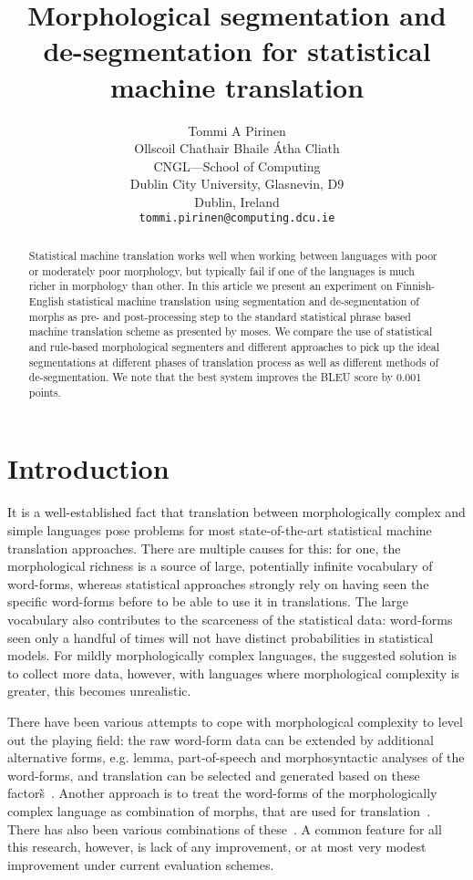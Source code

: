 \documentclass[11pt,letterpaper]{article}
\title{Morphological segmentation and de-segmentation for statistical machine
    translation\Thanks{This is an unpublished
authors draft}}
\author{Tommi A Pirinen\\
    Ollscoil Chathair Bhaile Átha Cliath\\
    CNGL---School of Computing\\
    Dublin City University, Glasnevin, D9\\
    Dublin, Ireland\\
    {\tt tommi.pirinen@computing.dcu.ie}
}
\begin{document}
\maketitle
\begin{abstract}
    Statistical machine translation works well when working between languages
    with poor or moderately poor morphology, but typically fail if one
    of the languages is much richer in morphology than other. In this article
    we present an experiment on Finnish-English statistical machine translation
    using segmentation and de-segmentation of morphs as pre- and post-processing
    step to the standard statistical phrase based machine translation scheme
    as presented by moses. We compare the use of statistical and rule-based
    morphological segmenters and different approaches to pick up the
    ideal segmentations at different phases of translation process as well
    as different methods of de-segmentation. We note that the best system
    improves the BLEU score by 0.001 points.
\end{abstract}

\section{Introduction}
\label{sec:introduction}

It is a well-established fact that translation between morphologically complex
and simple languages pose problems for most state-of-the-art statistical
machine translation approaches. There are multiple causes for this: for one,
the morphological richness is a source of large, potentially infinite
vocabulary of word-forms, whereas statistical approaches strongly rely on
having seen the specific word-forms before to be able to use it in
translations. The large vocabulary also contributes to the scarceness of the
statistical data: word-forms seen only a handful of times will not have
distinct probabilities in statistical models. For mildly morphologically
complex languages, the suggested solution is to collect more data, however,
with languages where morphological complexity is greater, this becomes
unrealistic.

There have been various attempts to cope with morphological complexity to level
out the playing field: the raw word-form data can be extended by additional
alternative forms, e.g. lemma, part-of-speech and morphosyntactic analyses of
the word-forms, and translation can be selected and generated based on these
factors̃~\cite{koehn2007factored}. Another approach is to treat the word-forms of the
morphologically complex language as combination of morphs, that are used for
translation~\cite{clifton2011combining}. There has also been various
combinations of these~\cite{luong2010hybrid,degispert2009minimum}. A common
feature for all this research, however, is lack of any improvement, or at most
very modest improvement under current evaluation schemes.
\end{document}
